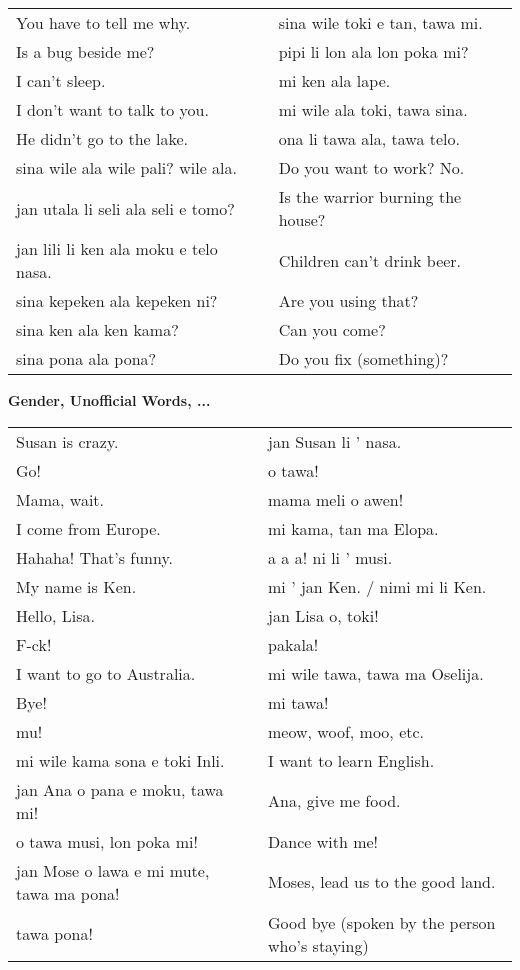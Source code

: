 \begin{supertabular}{p{5,5cm}|ll}
You have to tell me why.  && sina wile toki e tan, tawa mi. \\ %
Is a bug beside me?  && pipi li lon ala lon poka mi? \\ %
I can't sleep.  && mi ken ala lape. \\ %
I don't want to talk to you.  && mi wile ala toki, tawa sina. \\ %
He didn't go to the lake.  && ona li tawa ala, tawa telo. \\ %
sina wile ala wile pali? wile ala.  && Do you want to work? No. \\
jan utala li seli ala seli e tomo?  && Is the warrior burning the house? \\
jan lili li ken ala moku e telo nasa.  && Children can't drink beer. \\
sina kepeken ala kepeken ni?  && Are you using that? \\
sina ken ala ken kama?  && Can you come? \\
sina pona ala pona? && Do you fix (something)? \\
\end{supertabular} 

\textbf{Gender, Unofficial Words, ...} 
\label{'gender_unofficial_words_etc'}

\begin{supertabular}{p{5,5cm}|ll}
Susan is crazy.  && jan Susan li ' nasa. \\ %
Go!  && o tawa! \\ %
Mama, wait.  && mama meli o awen! \\ %
I come from Europe. && mi kama, tan ma Elopa. \\ %
Hahaha! That's funny.  && a a a! ni li ' musi. \\ %
My name is Ken.  && mi ' jan Ken. / nimi mi li Ken. \\ %
Hello, Lisa.  && jan Lisa o, toki! \\ %
F-ck! && pakala! \\ %
I want to go to Australia. && mi wile tawa, tawa ma Oselija. \\  %
Bye!  && mi tawa!  \\ %
mu!  && meow, woof, moo, etc. \\
mi wile kama sona e toki Inli.  && I want to learn English. \\
jan Ana o pana e moku, tawa mi!  && Ana, give me food. \\
o tawa musi, lon poka mi!  && Dance with me! \\
jan Mose o lawa e mi mute, tawa ma pona!  && Moses, lead us to the good land. \\
tawa pona!  && Good bye (spoken by the person who's staying) \\
\end{supertabular} 

